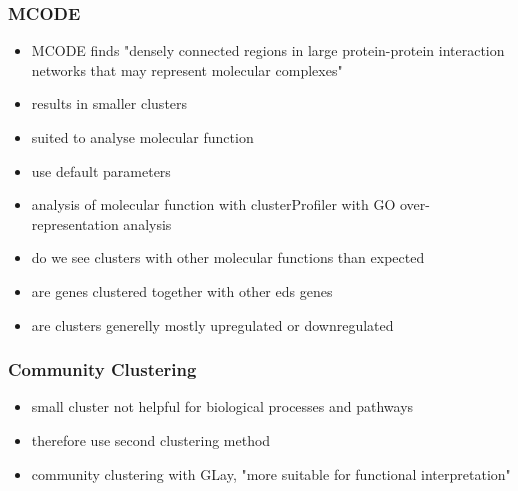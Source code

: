 \subsubsection{MCODE}
\begin{itemize}
	\item MCODE finds "densely connected regions in large protein-protein interaction networks that may represent molecular complexes" \cite{mcode}
	\item results in smaller clusters
	\item suited to analyse molecular function
	\item use default parameters
	\item analysis of molecular function with clusterProfiler with GO over-representation analysis
	\item do we see clusters with other molecular functions than expected
	\item are genes clustered together with other eds genes
	\item are clusters generelly mostly upregulated or downregulated
\end{itemize}
\subsubsection{Community Clustering}
\begin{itemize}
	\item small cluster not helpful for biological processes and pathways
	\item therefore use second clustering method
	\item community clustering with GLay, "more suitable for functional interpretation" \cite{GLay}
\end{itemize}